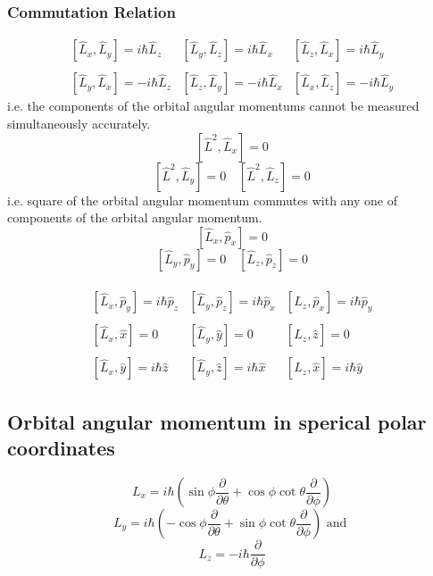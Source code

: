 \subsubsection{Commutation Relation}
$$
\begin{array}{lll}
{\left[\hat{L}_{x}, \hat{L}_{y}\right]=i \hbar \hat{L}_{z}} & {\left[\hat{L}_{y}, \hat{L}_{z}\right]=i \hbar \hat{L}_{x}} & {\left[\hat{L}_{z}, \hat{L}_{x}\right]=i \hbar \hat{L}_{y}} \\\\
{\left[\hat{L}_{y}, \hat{L}_{x}\right]=-i \hbar \hat{L}_{z}} & {\left[\hat{L}_{z}, \hat{L}_{y}\right]=-i \hbar \hat{L}_{x}} & {\left[\hat{L}_{x}, \hat{L}_{z}\right]=-i \hbar \hat{L}_{y}}
\end{array}
$$
i.e. the components of the orbital angular momentums cannot be measured simultaneously accurately.
$$
\left[\hat{L}^{2}, \hat{L}_{x}\right]=0
$$
$$
\left[\hat{L}^{2}, \hat{L}_{y}\right]=0 \quad\left[\hat{L}^{2}, \hat{L}_{z}\right]=0
$$
i.e. square of the orbital angular momentum commutes with any one of components of the orbital angular momentum.
$$
\left[\hat{L}_{x}, \hat{p}_{x}\right]=0
$$
$$
\left[\hat{L}_{y}, \hat{p}_{y}\right]=0 \quad\left[\hat{L}_{z}, \hat{p}_{z}\right]=0
$$\\
$$\begin{array}{lll}
	{\left[\hat{L}_{x}, \hat{p}_{y}\right]=i \hbar \hat{p}_{z}}  & {\left[\hat{L}_{y}, \hat{p}_{z}\right]=i \hbar \hat{p}_{x}} & {\left[\hat{L}_{z}, \hat{p}_{x}\right]=i \hbar \hat{p}_{y}} \\\\
	{\left[\hat{L}_{x}, \hat{x}\right]=0} & {\left[\hat{L}_{y}, \hat{y}\right]=0} & {\left[\hat{L}_{z}, \hat{z}\right]=0} \\\\
	{\left[\hat{L}_{x}, \hat{y}\right]=i \hbar \hat{z}} & {\left[\hat{L}_{y}, \hat{z}\right]=i \hbar \hat{x}} & {\left[\hat{L}_{z}, \hat{x}\right]=i \hbar \hat{y}}
\end{array}$$
\subsection{Orbital angular momentum in sperical polar coordinates }

	$$L_{x}=i\hbar\left(\sin \phi \frac{\partial}{\partial \theta}+\cos \phi \cot \theta \frac{\partial}{\partial \phi}\right) $$
	$$L_{y}=i \hbar\left(-\cos \phi \frac{\partial}{\partial \theta}+\sin \phi \cot \theta \frac{\partial}{\partial \phi}\right) \text { and }$$
	$$L_{z}=-i \hbar \frac{\partial}{\partial \phi}$$

